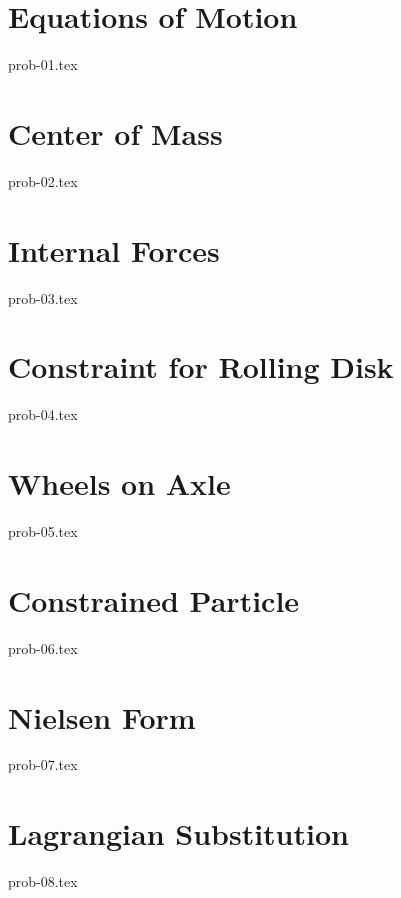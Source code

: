 \section{Equations of Motion}

{prob-01.tex}

\section{Center of Mass}

{prob-02.tex}

\section{Internal Forces}

{prob-03.tex}

\section{Constraint for Rolling Disk}\label{rollingdisk}

{prob-04.tex}

\section{Wheels on Axle}

{prob-05.tex}

\section{Constrained Particle}

{prob-06.tex}

\section{Nielsen Form}\label{nielsen}

{prob-07.tex}

\section{Lagrangian Substitution}\label{lagrangeinv}

{prob-08.tex}
